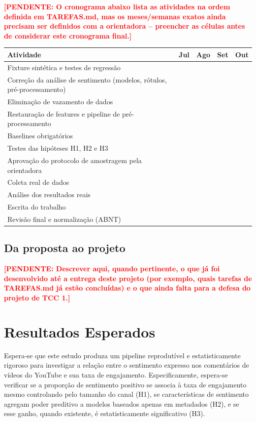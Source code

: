 \documentclass[12pt,a4paper]{article}
\newcommand{\pendente}[1]{\textcolor{red}{\textbf{[PENDENTE: #1]}}}
\begin{document}
\pendente{O cronograma abaixo lista as atividades na ordem definida em TAREFAS.md, mas os meses/semanas exatos ainda precisam ser definidos com a orientadora -- preencher as células antes de considerar este cronograma final.}

\begin{longtable}{|p{7cm}|c|c|c|c|}
\hline
\textbf{Atividade} & \textbf{Jul} & \textbf{Ago} & \textbf{Set} & \textbf{Out} \\
\hline
Fixture sintética e testes de regressão & & & & \\
\hline
Correção da análise de sentimento (modelos, rótulos, pré-processamento) & & & & \\
\hline
Eliminação de vazamento de dados & & & & \\
\hline
Restauração de features e pipeline de pré-processamento & & & & \\
\hline
Baselines obrigatórios & & & & \\
\hline
Testes das hipóteses H1, H2 e H3 & & & & \\
\hline
Aprovação do protocolo de amostragem pela orientadora & & & & \\
\hline
Coleta real de dados & & & & \\
\hline
Análise dos resultados reais & & & & \\
\hline
Escrita do trabalho & & & & \\
\hline
Revisão final e normalização (ABNT) & & & & \\
\hline
\end{longtable}

\subsection{Da proposta ao projeto}

\pendente{Descrever aqui, quando pertinente, o que já foi desenvolvido até a entrega deste projeto (por exemplo, quais tarefas de TAREFAS.md já estão concluídas) e o que ainda falta para a defesa do projeto de TCC 1.}

\section{Resultados Esperados}

Espera-se que este estudo produza um pipeline reprodutível e estatisticamente rigoroso para investigar a relação entre o sentimento expresso nos comentários de vídeos do YouTube e sua taxa de engajamento. Especificamente, espera-se verificar se a proporção de sentimento positivo se associa à taxa de engajamento mesmo controlando pelo tamanho do canal (H1), se características de sentimento agregam poder preditivo a modelos baseados apenas em metadados (H2), e se esse ganho, quando existente, é estatisticamente significativo (H3).
\end{document}
